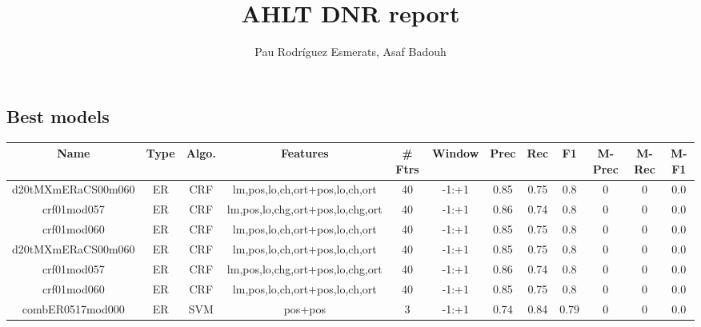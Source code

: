 \documentclass[a4paper]{article}
\title{AHLT DNR report}
\author{Pau Rodríguez Esmerats, Asaf Badouh }
\begin{document}
\begin{landscape}

\section{ Best models}
\begin{center}
\begin{tabular}{ |c|c|c|c|c|c|c|c|c|c|c|c|} 
 \hline
 	Name & Type & Algo. & Features & \# Ftrs & Window & Prec & Rec & F1 & M-Prec & M-Rec & M-F1\\
 \hline
 
 	
 		
 		\small{ d20tMXmERaCS00m060 } & ER & CRF & lm,pos,lo,ch,ort+pos,lo,ch,ort  &  40 &  -1:+1  &  0.85 & 0.75 & 0.8  &  0 & 0 & 0.0 \\
 		

 	
 
 	
 		
 		\small{ crf01mod057 } & ER & CRF & lm,pos,lo,chg,ort+pos,lo,chg,ort  &  40 &  -1:+1  &  0.86 & 0.74 & 0.8  &  0 & 0 & 0.0 \\
 		

 	
 
 	
 		
 		\small{ crf01mod060 } & ER & CRF & lm,pos,lo,ch,ort+pos,lo,ch,ort  &  40 &  -1:+1  &  0.85 & 0.75 & 0.8  &  0 & 0 & 0.0 \\
 		

 	
 
 	
 		
 		\small{ d20tMXmERaCS00m060 } & ER & CRF & lm,pos,lo,ch,ort+pos,lo,ch,ort  &  40 &  -1:+1  &  0.85 & 0.75 & 0.8  &  0 & 0 & 0.0 \\
 		

 	
 
 	
 		
 		\small{ crf01mod057 } & ER & CRF & lm,pos,lo,chg,ort+pos,lo,chg,ort  &  40 &  -1:+1  &  0.86 & 0.74 & 0.8  &  0 & 0 & 0.0 \\
 		

 	
 
 	
 		
 		\small{ crf01mod060 } & ER & CRF & lm,pos,lo,ch,ort+pos,lo,ch,ort  &  40 &  -1:+1  &  0.85 & 0.75 & 0.8  &  0 & 0 & 0.0 \\
 		

 	
 
 	
 		
 		\small{ combER0517mod000 } & ER & SVM & pos+pos  &  3 &  -1:+1  &  0.74 & 0.84 & 0.79  &  0 & 0 & 0.0 \\
 		


\end{tabular}
\end{center}
\end{landscape}
\end{document}
